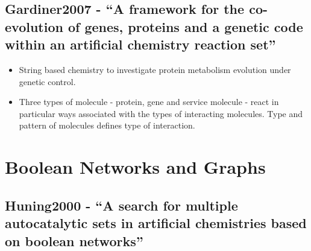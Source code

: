 		\hypertarget{gardiner2007---a-framework-for-the-co-evolution-of-genes-proteins-and-a-genetic-code-within-an-artificial-chemistry-reaction-set}{\subsection{Gardiner2007
				- ``A framework for the co-evolution of genes, proteins and a genetic
				code within an artificial chemistry reaction
				set''}\label{gardiner2007---a-framework-for-the-co-evolution-of-genes-proteins-and-a-genetic-code-within-an-artificial-chemistry-reaction-set}}
		
		\begin{itemize}
			\item
			
			String based chemistry to investigate protein metabolism evolution
			under genetic control.
			
			\item
			
			Three types of molecule - protein, gene and service molecule - react
			in particular ways associated with the types of interacting molecules.
			Type and pattern of molecules defines type of interaction.
			
		\end{itemize}
		
		\hypertarget{boolean-networks-and-graphs}{\section{Boolean Networks and
				Graphs}\label{boolean-networks-and-graphs}}
		
		\hypertarget{huning2000---a-search-for-multiple-autocatalytic-sets-in-artificial-chemistries-based-on-boolean-networks}{\subsection{Huning2000
				- ``A search for multiple autocatalytic sets in artificial chemistries
				based on boolean
				networks''}\label{huning2000---a-search-for-multiple-autocatalytic-sets-in-artificial-chemistries-based-on-boolean-networks}}
		
